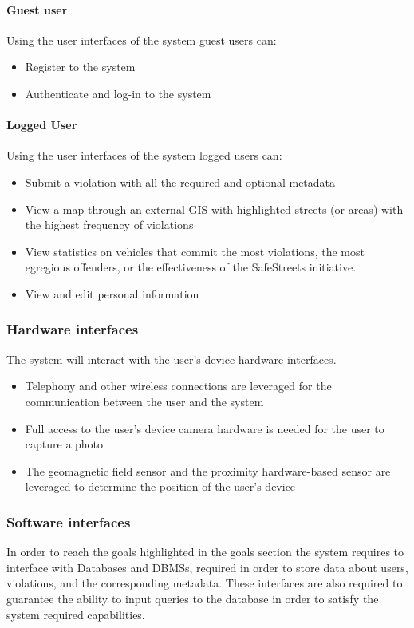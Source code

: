 \paragraph{Guest user}
	Using the user interfaces of the system guest users can:
	\begin{itemize}
		\item Register to the system
		\item Authenticate and log-in to the system
	\end{itemize}
	
\paragraph{Logged User}
	Using the user interfaces of the system logged users can:
	\begin{itemize}
		\item Submit a violation with all the required and optional metadata
		\item View a map through an external GIS with highlighted streets (or areas) with the highest frequency of violations
		\item View statistics on vehicles that commit the most violations, the most egregious offenders, or the effectiveness of the SafeStreets initiative.
		\item View and edit personal information
	\end{itemize}
		
\subsubsection{Hardware interfaces}
	The system will interact with the user's device hardware interfaces.	
	\begin{itemize} 
		\item Telephony and other wireless connections are leveraged for the communication between the user and the system
		\item Full access to the user's device camera hardware is needed for the user to capture a photo
		\item The geomagnetic field sensor and the proximity hardware-based sensor are leveraged to determine the position of the user's device
	\end{itemize}

\subsubsection{Software interfaces}
	In order to reach the goals highlighted in the goals section the system requires to interface with Databases and DBMSs, required in order to store data about users, violations, and the corresponding metadata. These interfaces are also required to guarantee the ability to input queries to the database in order to satisfy the system required capabilities.
	
